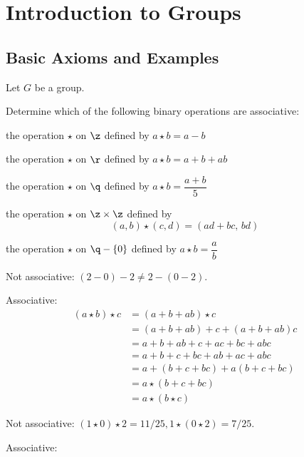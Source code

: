 \section{Introduction to Groups}

\subsection{Basic Axioms and Examples}

Let $G$ be a group.

\begin{problems}
    \item Determine which of the following binary operations are associative:
    \begin{problems}
        \item the operation $\star$ on $\z$ defined by $a \star b = a - b$
        \item the operation $\star$ on $\r$ defined by $a \star b = a + b + ab$
        \item the operation $\star$ on $\q$ defined by $a \star b = \dfrac{a + b}{5}$
        \item the operation $\star$ on $\z \times \z$ defined by 
        \[
        (a,b) \star (c,d) = (ad + bc, \, bd)
        \]
        \item the operation $\star$ on $\q - \{0\}$ defined by $a \star b = \dfrac{a}{b}$
    \end{problems}
    \begin{solalph}
        \item Not associative: $(2 - 0) - 2 \neq 2 - (0 -2)$.
        \item Associative:
        \begin{align*}
            (a \star b) \star c & = (a + b + ab) \star c \\
            & = (a + b + ab) + c + (a + b + ab)c \\
            & = a + b + ab + c + ac + bc + abc \\
            & = a + b + c + bc + ab + ac + abc \\
            & = a + (b + c + bc) + a(b + c + bc) \\
            & = a \star (b + c + bc) \\
            & = a \star (b \star c)
        \end{align*}
        \item Not associative: $(1 \star 0) \star 2 = 11/25, 1 \star (0 \star 2) = 7/25$.
        \item Associative:

\end{solalph}
\end{problems}
